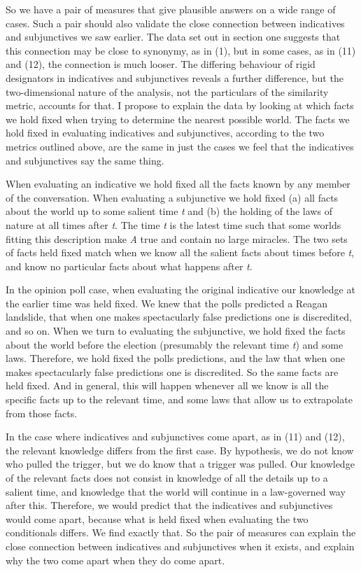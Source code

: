 \documentclass[
  10pt,
  letterpaper,
  DIV=11,
  numbers=noendperiod,
  twoside]{scrartcl}
\begin{document}
So we have a pair of measures that give plausible answers on a wide
range of cases. Such a pair should also validate the close connection
between indicatives and subjunctives we saw earlier. The data set out in
section one suggests that this connection may be close to synonymy, as
in (1), but in some cases, as in (11) and (12), the connection is much
looser. The differing behaviour of rigid designators in indicatives and
subjunctives reveals a further difference, but the two-dimensional
nature of the analysis, not the particulars of the similarity metric,
accounts for that. I propose to explain the data by looking at which
facts we hold fixed when trying to determine the nearest possible world.
The facts we hold fixed in evaluating indicatives and subjunctives,
according to the two metrics outlined above, are the same in just the
cases we feel that the indicatives and subjunctives say the same thing.

When evaluating an indicative we hold fixed all the facts known by any
member of the conversation. When evaluating a subjunctive we hold fixed
(a) all facts about the world up to some salient time \emph{t} and (b)
the holding of the laws of nature at all times after \emph{t}. The time
\emph{t} is the latest time such that some worlds fitting this
description make \emph{A} true and contain no large miracles. The two
sets of facts held fixed match when we know all the salient facts about
times before \emph{t}, and know no particular facts about what happens
after \emph{t}.

In the opinion poll case, when evaluating the original indicative our
knowledge at the earlier time was held fixed. We knew that the polls
predicted a Reagan landslide, that when one makes spectacularly false
predictions one is discredited, and so on. When we turn to evaluating
the subjunctive, we hold fixed the facts about the world before the
election (presumably the relevant time \emph{t}) and some laws.
Therefore, we hold fixed the polls predictions, and the law that when
one makes spectacularly false predictions one is discredited. So the
same facts are held fixed. And in general, this will happen whenever all
we know is all the specific facts up to the relevant time, and some laws
that allow us to extrapolate from those facts.

In the case where indicatives and subjunctives come apart, as in (11)
and (12), the relevant knowledge differs from the first case. By
hypothesis, we do not know who pulled the trigger, but we do know that a
trigger was pulled. Our knowledge of the relevant facts does not consist
in knowledge of all the details up to a salient time, and knowledge that
the world will continue in a law-governed way after this. Therefore, we
would predict that the indicatives and subjunctives would come apart,
because what is held fixed when evaluating the two conditionals differs.
We find exactly that. So the pair of measures can explain the close
connection between indicatives and subjunctives when it exists, and
explain why the two come apart when they do come apart.
\end{document}
